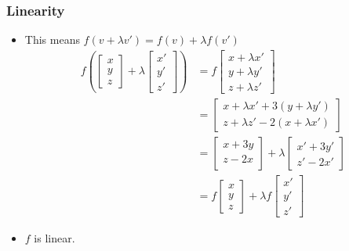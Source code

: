 \documentclass[8pt,dvipsnames]{beamer}
\begin{document}
\begin{frame}
  \frametitle{Linearity}
  \begin{itemize}
  \item This means $f(v+ \lambda v') = f(v) + \lambda f(v')$
    \begin{align*}
     f\left(
    \begin{bmatrix}
      x\\y\\z
    \end{bmatrix}+\lambda
    \begin{bmatrix}
      x'\\y'\\z'
    \end{bmatrix}
    \right)
    &= f
    \begin{bmatrix}
      x+\lambda x'\\y+\lambda y'\\z+\lambda z'
    \end{bmatrix}\\
    &=
    \begin{bmatrix}
      x+\lambda x'+3(y+\lambda y')\\
      z+\lambda z'-2(x+\lambda x')
    \end{bmatrix}\\
    &=
    \begin{bmatrix}
      x+3y\\
      z-2x\\
    \end{bmatrix}
    +\lambda 
    \begin{bmatrix}
      x'+3y'\\
      z'-2x'
    \end{bmatrix}\\
    &= f
    \begin{bmatrix}
      x\\y\\z
    \end{bmatrix}
    + \lambda f
    \begin{bmatrix}
      x'\\y'\\z'
    \end{bmatrix}
  \end{align*}
\item $f$ is linear.
\end{itemize}
\end{frame}
\end{document}
